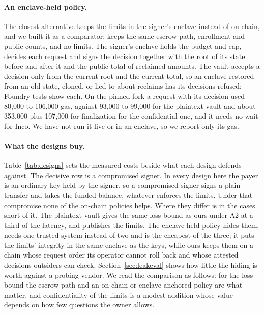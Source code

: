 \paragraph{An enclave-held policy.} The closest alternative keeps the limits in the signer's enclave instead of on chain, and we built it as a
comparator:  keeps the same escrow path, enrollment and public counts, and no limits. The signer's enclave holds the budget and cap,
decides each request and signs the decision together with the root of its state before and after it and the public total of reclaimed amounts. The vault
accepts a decision only from the current root and the current total, so an enclave restored from an old state, cloned, or lied to about reclaims has its
decisions refused; Foundry tests show each. On the pinned fork a request with its decision used 80{,}000 to 106{,}000 gas, against 93{,}000 to 99{,}000 for the
plaintext vault and about 353{,}000 plus 107{,}000 for finalization for the confidential one, and it needs no wait for Inco. We have not run it live or in an
enclave, so we report only its gas.

\paragraph{What the designs buy.} Table~\ref{tab:designs} sets the measured costs beside what each design defends against. The decisive row is a compromised
signer. In every design here the payer is an ordinary key held by the signer, so a compromised signer signs a plain transfer and takes the funded balance,
whatever enforces the limits. Under that compromise none of the on-chain policies helps. Where they differ is in the cases short of it. The plaintext vault
gives the same loss bound as ours under A2 at a third of the latency, and publishes the limits. The enclave-held policy hides them, needs one trusted
system instead of two and is the cheapest of the three; it puts the limits' integrity in the same enclave as the keys, while ours keeps them on a chain
whose request order its operator cannot roll back and whose attested decisions outsiders can check. Section~\ref{sec:leakeval} shows how little the hiding
is worth against a probing vendor. We read the comparison as follows: for the loss bound the escrow path and an on-chain or enclave-anchored policy are
what matter, and confidentiality of the limits is a modest addition whose value depends on how few questions the owner allows.

